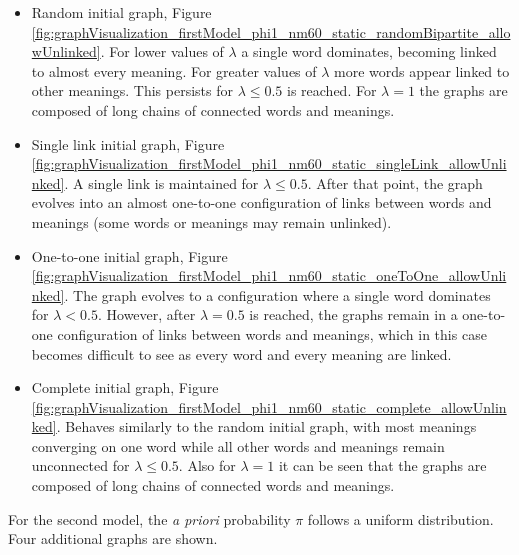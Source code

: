 \begin{redenv}
  \begin{itemize}
  \item Random initial graph, Figure \ref{fig:graphVisualization_firstModel_phi1_nm60_static_randomBipartite_allowUnlinked}.
    For lower values of $\lambda$ a single word dominates, becoming linked to almost every meaning.
    For greater values of $\lambda$ more words appear linked to other meanings.
    This persists for $\lambda \leq 0.5$ is reached.
    For $\lambda=1$ the graphs are composed of long chains of connected words and meanings.
  \item Single link initial graph, Figure \ref{fig:graphVisualization_firstModel_phi1_nm60_static_singleLink_allowUnlinked}.
    A single link is maintained for $\lambda \leq 0.5$.
    After that point, the graph evolves into an almost one-to-one configuration of links between words and meanings (some words or meanings may remain unlinked).
  \item One-to-one initial graph, Figure \ref{fig:graphVisualization_firstModel_phi1_nm60_static_oneToOne_allowUnlinked}.
    The graph evolves to a configuration where a single word dominates for $\lambda < 0.5$.
    However, after $\lambda=0.5$ is reached, the graphs remain in a one-to-one configuration of links between words and meanings, which in this case becomes difficult to see as every word and every meaning are linked.
  \item Complete initial graph, Figure \ref{fig:graphVisualization_firstModel_phi1_nm60_static_complete_allowUnlinked}.
    Behaves similarly to the random initial graph, with most meanings converging on one word while all other words and meanings remain unconnected for $\lambda \leq 0.5$.
    Also for $\lambda=1$ it can be seen that the graphs are composed of long chains of connected words and meanings.
  \end{itemize}
\end{redenv}

For the second model, the \emph{a priori} probability $\pi$ follows a uniform distribution.
Four additional graphs are shown.

